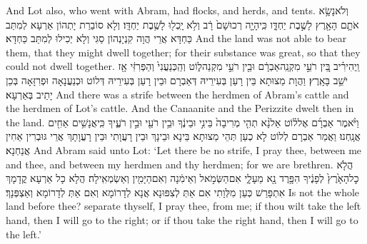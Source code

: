 {And Lot also, who went with Abram, had flocks, and herds, and tents.}{}
{וְלֹא\maqqaf נָשָׂ֥א אֹתָ֛ם הָאָ֖רֶץ לָשֶׁ֣בֶת יַחְדָּ֑ו כִּֽי\maqqaf הָיָ֤ה רְכוּשָׁם֙ רָ֔ב וְלֹ֥א יָֽכְל֖וּ לָשֶׁ֥בֶת יַחְדָּֽו׃}
{וְלָא סוֹבַרַת יָתְהוֹן אַרְעָא לְמִתַּב כַּחְדָּא אֲרֵי הֲוָה קִנְיָנְהוֹן סַגִּי וְלָא יְכִילוּ לְמִתַּב כַּחְדָּא׃}
{And the land was not able to bear them, that they might dwell together; for their substance was great, so that they could not dwell together.}{}
{וַֽיְהִי\maqqaf רִ֗יב בֵּ֚ין רֹעֵ֣י מִקְנֵֽה\maqqaf אַבְרָ֔ם וּבֵ֖ין רֹעֵ֣י מִקְנֵה\maqqaf ל֑וֹט וְהַֽכְּנַעֲנִי֙ וְהַפְּרִזִּ֔י אָ֖ז יֹשֵׁ֥ב בָּאָֽרֶץ׃}
{וַהֲוָת מַצוּתָא בֵּין רָעַן בְּעִירֵיהּ דְּאַבְרָם וּבֵין רָעַן בְּעִירֵיהּ דְּלוֹט וּכְנַעֲנָאָה וּפְרִזָּאָה בְּכֵן יָתֵיב בְּאַרְעָא׃}
{And there was a strife between the herdmen of Abram’s cattle and the herdmen of Lot’s cattle. And the Canaanite and the Perizzite dwelt then in the land.}{}
{וַיֹּ֨אמֶר אַבְרָ֜ם אֶל\maqqaf ל֗וֹט אַל\maqqaf נָ֨א תְהִ֤י מְרִיבָה֙ בֵּינִ֣י וּבֵינֶ֔ךָ וּבֵ֥ין רֹעַ֖י וּבֵ֣ין רֹעֶ֑יךָ כִּֽי\maqqaf אֲנָשִׁ֥ים אַחִ֖ים אֲנָֽחְנוּ׃}
{וַאֲמַר אַבְרָם לְלוֹט לָא כְעַן תְּהֵי מַצוּתָא בֵּינָא וּבֵינָךְ וּבֵין רָעֲוָתִי וּבֵין רָעֲוָתָךְ אֲרֵי גּוּבְרִין אַחִין אֲנַחְנָא׃}
{And Abram said unto Lot: ‘Let there be no strife, I pray thee, between me and thee, and between my herdmen and thy herdmen; for we are brethren.}{}
{הֲלֹ֤א כׇל\maqqaf הָאָ֙רֶץ֙ לְפָנֶ֔יךָ הִפָּ֥רֶד נָ֖א מֵעָלָ֑י אִם\maqqaf הַשְּׂמֹ֣אל וְאֵימִ֔נָה וְאִם\maqqaf הַיָּמִ֖ין וְאַשְׂמְאִֽילָה׃}
{הֲלָא כָל אַרְעָא קֳדָמָךְ אִתְפָּרַשׁ כְּעַן מִלְּוָתִי אִם אַתְּ לְצִפּוּנָא אֲנָא לְדָרוֹמָא וְאִם אַתְּ לְדָרוֹמָא וְאַצְפְּנָךְ׃}
{Is not the whole land before thee? separate thyself, I pray thee, from me; if thou wilt take the left hand, then I will go to the right; or if thou take the right hand, then I will go to the left.’}{}
